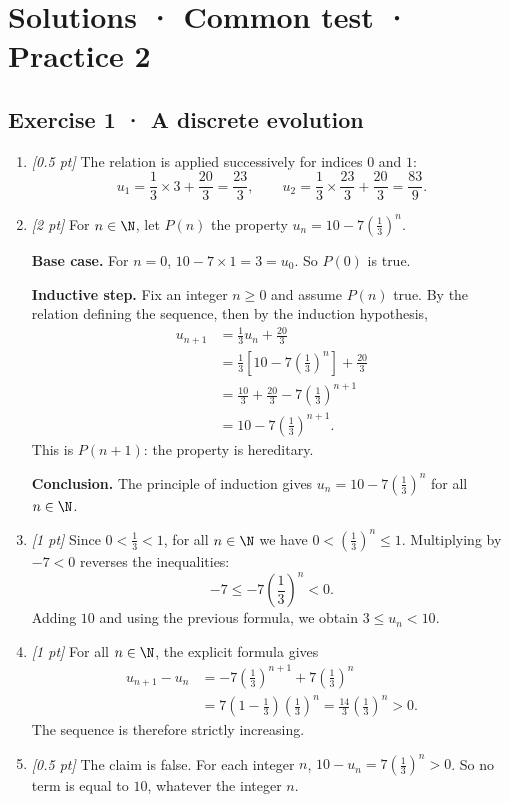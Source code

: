 \ifmxteacher\mxnewpage

\section*{Solutions · Common test · Practice 2}\label{cor:3-2}

\subsection*{Exercise 1 · A discrete evolution}\begin{enumerate}

\item \textit{[0.5 pt]} The relation is applied successively for indices $0$ and $1$:\[u_1=\frac{1}{3}\times 3+\frac{20}{3}=\frac{23}{3},\qquad u_2=\frac{1}{3}\times \frac{23}{3}+\frac{20}{3}=\frac{83}{9}.\]

\item \textit{[2 pt]} For $n\in\N$, let $P(n)$ the property $u_n=10-7\left(\frac{1}{3}\right)^n$.
\par\smallskip\textbf{Base case.} For $n=0$, $10-7\times1=3=u_0$. So $P(0)$ is true.
\par\smallskip\textbf{Inductive step.} Fix an integer $n\ge0$ and assume $P(n)$ true. By the relation defining the sequence, then by the induction hypothesis,
\[\begin{aligned}u_{n+1}&=\frac{1}{3}u_n+\frac{20}{3}\\
&=\frac{1}{3}\left[10-7\left(\frac{1}{3}\right)^n\right]+\frac{20}{3}\\
&=\frac{10}{3}+\frac{20}{3}-7\left(\frac{1}{3}\right)^{n+1}\\
&=10-7\left(\frac{1}{3}\right)^{n+1}.
\end{aligned}\]
This is $P(n+1)$: the property is hereditary.
\par\smallskip\textbf{Conclusion.} The principle of induction gives $u_n=10-7\left(\frac{1}{3}\right)^n$ for all $n\in\N$.

\item \textit{[1 pt]} Since $0<\frac{1}{3}<1$, for all $n\in\N$ we have $0<(\frac{1}{3})^n\le1$. Multiplying by $-7<0$ reverses the inequalities:
\[-7\le-7(\frac{1}{3})^n<0.\]
Adding $10$ and using the previous formula, we obtain $3\le u_n<10$.

\item \textit{[1 pt]} For all $n\in\N$, the explicit formula gives
\[\begin{aligned}u_{n+1}-u_n&=-7(\frac{1}{3})^{n+1}+7(\frac{1}{3})^n\\&=7(1-\frac{1}{3})(\frac{1}{3})^n=\frac{14}{3}(\frac{1}{3})^n>0.\end{aligned}\]
The sequence is therefore strictly increasing.

\item \textit{[0.5 pt]} The claim is false. For each integer $n$, $10-u_n=7(\frac{1}{3})^n>0$. So no term is equal to $10$, whatever the integer $n$.

\end{enumerate}

